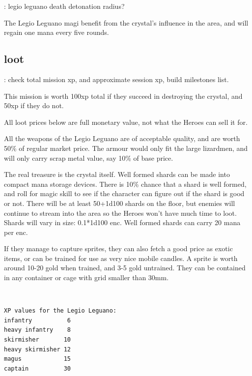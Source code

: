 \todo: legio leguano death detonation radius?

The Legio Leguano magi benefit from the crystal's influence in the area, and will regain one mana every five rounds.






\subsection*{loot}
\todo: check total mission xp, and approximate session xp, build milestones list.

This mission is worth 100xp total if they succeed in destroying the crystal, and 50xp if they do not.

All loot prices below are full monetary value, not what the Heroes can sell it for.

All the weapons of the Legio Leguano are of acceptable quality, and are worth 50\% of regular market price. The armour would only fit the large lizardmen, and will only carry scrap metal value, say 10\% of base price.

The real treasure is the crystal itself. Well formed shards can be made into compact mana storage devices. There is 10\% chance that a shard is well formed, and roll for magic skill to see if the character can figure out if the shard is good or not. There will be at least 50+1d100 shards on the floor, but enemies will continue to stream into the area so the Heroes won't have much time to loot. Shards will vary in size: 0.1*1d100 enc. Well formed shards can carry 20 mana per enc.

If they manage to capture sprites, they can also fetch a good price as exotic items, or can be trained for use as very nice mobile candles. A sprite is worth around 10-20 gold when trained, and 3-5 gold untrained. They can be contained in any container or cage with grid smaller than 30mm.

\

\small \begin{verbatim}
XP values for the Legio Leguano:
infantry          6
heavy infantry    8
skirmisher       10
heavy skirmisher 12
magus            15
captain          30
\end{verbatim} \normalsize








